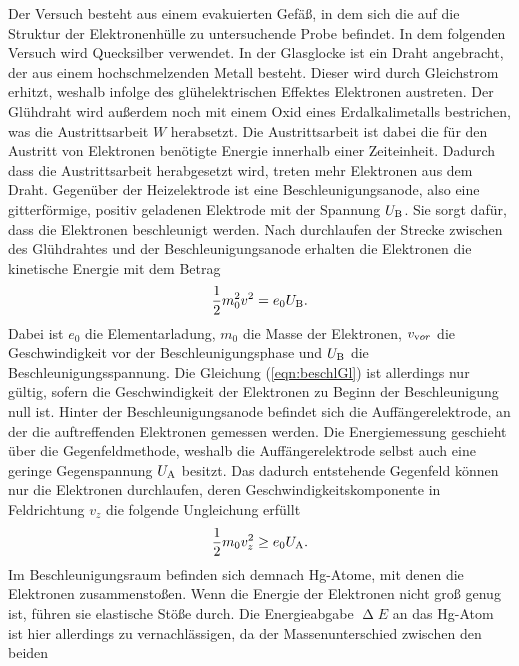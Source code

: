 \noindent
Der Versuch besteht aus einem evakuierten Gefäß, in dem sich die auf die Struktur der Elektronenhülle zu untersuchende Probe befindet. In dem folgenden Versuch wird Quecksilber verwendet.
In der Glasglocke ist ein Draht angebracht, der aus einem hochschmelzenden Metall besteht. Dieser wird durch Gleichstrom erhitzt, weshalb infolge des glühelektrischen Effektes Elektronen austreten.
Der Glühdraht wird außerdem noch mit einem Oxid eines Erdalkalimetalls bestrichen, was die Austrittsarbeit $W$ herabsetzt. Die Austrittsarbeit ist dabei die für den Austritt von Elektronen benötigte Energie innerhalb einer Zeiteinheit.
Dadurch dass die Austrittsarbeit herabgesetzt wird, treten mehr Elektronen aus dem Draht.
Gegenüber der Heizelektrode ist eine Beschleunigungsanode, also eine gitterförmige, positiv geladenen Elektrode mit der Spannung $U_{\text B}$. Sie sorgt dafür, dass die Elektronen beschleunigt werden. Nach durchlaufen der Strecke zwischen des Glühdrahtes und der Beschleunigungsanode
erhalten die Elektronen die kinetische Energie mit dem Betrag
\begin{align}
    \frac 12 m_0^2 v^2 = e_0 U_{\text B}.
    \label{eqn:beschlGl}
\end{align}
Dabei ist $e_0$ die Elementarladung, $m_0$ die Masse der Elektronen, $v_{\text vor}$ 
die Geschwindigkeit vor der Beschleunigungsphase und $U_{\text B}$ die Beschleunigungsspannung.
Die Gleichung (\ref{eqn:beschlGl}) ist allerdings nur gültig, sofern die Geschwindigkeit der Elektronen zu Beginn der Beschleunigung null ist.
Hinter der Beschleunigungsanode befindet sich die Auffängerelektrode, an der die auftreffenden Elektronen gemessen werden. Die Energiemessung geschieht über die Gegenfeldmethode, weshalb die Auffängerelektrode selbst auch eine geringe Gegenspannung $U_{\text A}$ besitzt.
Das dadurch entstehende Gegenfeld können nur die Elektronen durchlaufen, deren Geschwindigkeitskomponente in Feldrichtung $v_z$ die folgende Ungleichung erfüllt
\begin{align}
    \label{eqn:gegnFeldV}
    \frac 12 m_0 v_z^2 \geq e_0 U_{\text A}.
\end{align}
Im Beschleunigungsraum befinden sich demnach Hg-Atome, mit denen die Elektronen zusammenstoßen. Wenn die Energie der Elektronen nicht groß genug ist, führen sie elastische Stöße durch. Die Energieabgabe $\upDelta E$ an das Hg-Atom ist hier allerdings zu vernachlässigen, da der Massenunterschied zwischen den beiden
